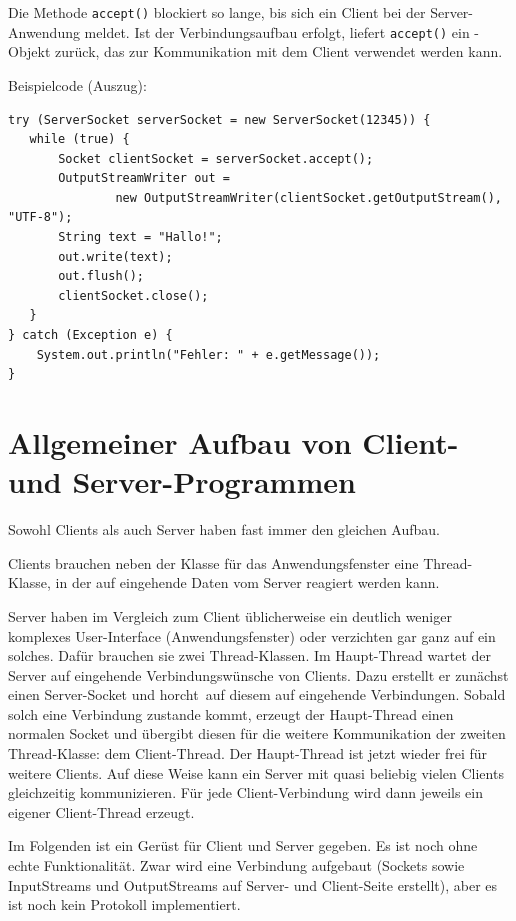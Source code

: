 Die Methode \lstinline|accept()| blockiert so lange, bis sich ein Client bei der
Server-Anwendung meldet. Ist der Verbindungsaufbau erfolgt, liefert
\lstinline|accept()| ein -Objekt zurück, das zur
Kommunikation mit dem Client verwendet werden kann.

Beispielcode (Auszug):

\begin{lstlisting}
try (ServerSocket serverSocket = new ServerSocket(12345)) {
   while (true) {
       Socket clientSocket = serverSocket.accept();
       OutputStreamWriter out = 
               new OutputStreamWriter(clientSocket.getOutputStream(), "UTF-8");
       String text = "Hallo!";
       out.write(text);
       out.flush();
       clientSocket.close();
   }
} catch (Exception e) {
    System.out.println("Fehler: " + e.getMessage());
}
\end{lstlisting}


\section{Allgemeiner Aufbau von Client- und Server-Programmen}

Sowohl Clients als auch Server haben fast immer den gleichen Aufbau. 

\begin{compactitem}
\item Clients brauchen neben der Klasse für das Anwendungsfenster eine
Thread-Klasse, in der auf eingehende Daten vom Server reagiert werden kann.

\item Server haben im Vergleich zum Client üblicherweise ein deutlich weniger
komplexes User-Interface (Anwendungsfenster) oder verzichten gar ganz auf ein
solches. Dafür brauchen sie zwei Thread-Klassen. Im Haupt-Thread wartet der
Server auf eingehende Verbindungswünsche von Clients. Dazu erstellt er zunächst
einen Server-Socket und \glqq horcht\grqq\ auf diesem auf eingehende
Verbindungen. Sobald solch eine Verbindung zustande kommt, erzeugt der
Haupt-Thread einen normalen Socket und übergibt diesen für die weitere
Kommunikation der zweiten Thread-Klasse: dem Client-Thread. Der Haupt-Thread
ist jetzt wieder frei für weitere Clients. Auf diese Weise kann ein Server mit
quasi beliebig vielen Clients gleichzeitig kommunizieren. Für jede
Client-Verbindung wird dann jeweils ein eigener Client-Thread erzeugt.
\end{compactitem}

Im Folgenden ist ein Gerüst für Client und Server gegeben. Es ist noch ohne
echte Funktionalität. Zwar wird eine Verbindung aufgebaut (Sockets sowie
InputStreams und OutputStreams auf Server- und Client-Seite erstellt), aber es
ist noch kein Protokoll implementiert.

